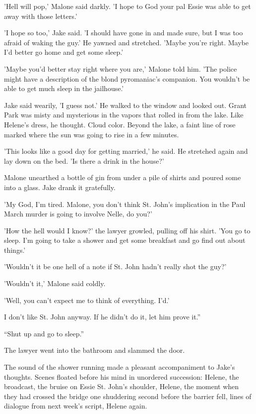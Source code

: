 \documentclass{novel}
\begin{document}
'Hell will pop,' Malone said darkly. 'I hope to God your pal Essie was able to get away with those letters.'

'I hope so too,' Jake said. 'I should have gone in and made sure, but I was too afraid of waking the guy.' He yawned and stretched. 'Maybe you’re right. Maybe I’d better go home and get some sleep.'

'Maybe you’d better stay right where you are,' Malone told him. 'The police might have a description of the blond pyromaniac’s companion. You wouldn’t be able to get much sleep in the jailhouse.'

Jake said wearily, 'I guess not.' He walked to the window and looked out. Grant Park was misty and mysterious in the vapors that rolled in from the lake. Like Helene’s dress, he thought. Cloud color. Beyond the lake, a faint line of rose marked where the sun was going to rise in a few minutes.

'This looks like a good day for getting married,' he said. He stretched again and lay down on the bed. 'Is there a drink in the house?'

Malone unearthed a bottle of gin from under a pile of shirts and poured some into a glass. Jake drank it gratefully.

'My God, I’m tired. Malone, you don’t think St. John’s implication in the Paul March murder is going to involve Nelle, do you?'

'How the hell would I know?' the lawyer growled, pulling off his shirt. 'You go to sleep. I’m going to take a shower and get some breakfast and go find out about things.'

'Wouldn’t it be one hell of a note if St. John hadn’t really shot the guy?'

'Wouldn’t it,' Malone said coldly.

'Well, you can’t expect me to think of everything. I'd.'

I don’t like St. John anyway. If he didn’t do it, let him prove it.”

“Shut up and go to sleep.”

The lawyer went into the bathroom and slammed the door.

The sound of the shower running made a pleasant accompaniment to Jake’s thoughts. Scenes floated before his mind in unordered succession: Helene, the broadcast, the bruise on Essie St. John’s shoulder, Helene, the moment when they had crossed the bridge one shuddering second before the barrier fell, lines of dialogue from next week’s script, Helene again.
\end{document}
